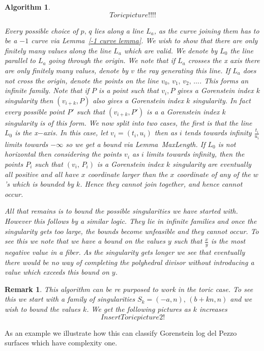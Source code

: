 \documentclass[12pt]{amsart}
\theoremstyle{plain}
\newtheorem{algorithm}[thm]{Algorithm}
\newtheorem*{rem}{Remark}
\begin{document}
\begin{algorithm}
\[
Toric picture!!!!
\] 
 
Every possible choice of $p, \, q$ lies along a line $L_a$, as the curve joining them has to be a $-1$ curve via Lemma~\ref{-1 curve lemma}. We wish to show that there are only finitely many values along the line $L_a$ which are valid. We denote by $L_0$ the line parallel to $L_a$ going through the origin. We note that if $L_a$ crosses the x axis there are only finitely many values, denote by $v$ the ray generating this line. If $L_a$ does not cross the origin, denote the points on the line $v_0, \, v_1, \, v_2, \, \dots$. This forms an infinite family. Note that if $P$ is a point such that $v_i, P$ gives a Gorenstein index $k$ singularity then $(v_{i+k}, P )$ also gives a Gorenstein index $k$ singularity. In fact every possible point $P'$ such that $(v_{i+k}, P')$ is a a Gorenstein index $k$ singularity is of this form. We now split into two cases, the first is that the line $L_0$ is the x$-$axis. In this case, let $v_i = (t_i, u_i)$ then as $i$ tends towards infinity $\frac{t_i}{u_i}$ limits towards $-\infty$ so we get a bound via Lemma~{MaxLength}. If $L_0$ is not horizontal then considering the points $v_i$ as $i$ limits towards infinity, then the points $P_i$ such that $(v_i, \, P_i)$ is a Gorenstein index $k$ singularity are eventually all positive and all have $x$ coordinate larger than the $x$ coordinate of any of the $w$'s which is bounded by $k$. Hence they cannot join together, and hence cannot occur. 
 
All that remains is to bound the possible singularities we have started with. However this follows by a similar logic. They lie in infinite families and once the singularity gets too large, the bounds become unfeasible and they cannot occur. To see this we note that we have a bound on the values $y$ such that $\frac{x}{y}$ is the most negative value in a fiber. As the singularity gets longer we see that eventually there would be no way of completing the polyhedral divisor without introducing a value which exceeds this bound on $y$. 
\end{algorithm}

\begin{rem}
This algorithm can be re purposed to work in the toric case. To see this we start with a family of singularities $ S_k = (-a, n), \, (b+kn, n)$ and we wish to bound the values $k$. We get the following pictures as $k$ increases
\[
Insert Toric picture 2!
\] 
\end{rem}

As an example we illustrate how this can classify Gorenstein log del Pezzo surfaces which have complexity one.
\end{document}
